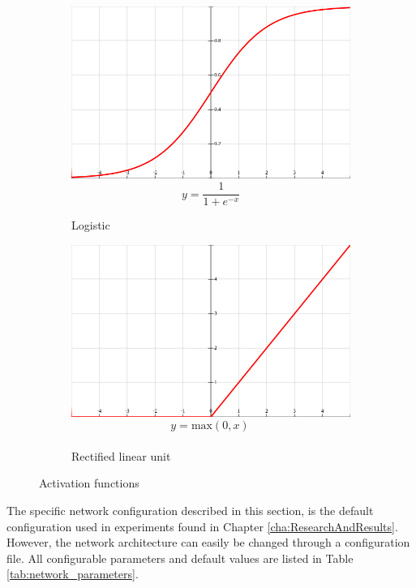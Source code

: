 \begin{figure}[h]
\begin{subfigure}{0.45\textwidth}
\includegraphics[width=\linewidth]{figs/sigmoid2.png}
$$ y = \frac{1}{1+ e^{-x}}$$
\caption{Logistic} \label{fig:activation_sigmoid}
\end{subfigure}
\hspace*{\fill} %
\begin{subfigure}{0.45\textwidth}
\includegraphics[width=\linewidth]{figs/relu2.png}
$$ y = \text{max}(0, x) \frac{}{}$$
\caption{Rectified linear unit} \label{fig:activation_relu}
\end{subfigure}
\hspace*{\fill} %
\caption{Activation functions} \label{fig:activation_functions}
\end{figure}


The specific network configuration described in this section, is the default configuration used in experiments found in Chapter \ref{cha:ResearchAndResults}. However, the network architecture can easily be changed through a configuration file. All configurable parameters and default values are listed in Table \ref{tab:network_parameters}.\\

